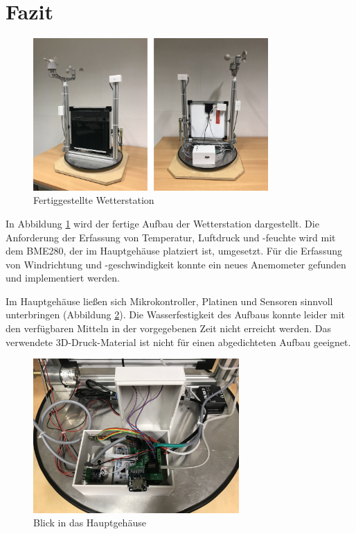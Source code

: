 \section{Fazit}\label{sec:fazit}
\begin{figure}[H]
  \centering
  \includegraphics[width=0.8\textwidth]{./img/Wetterstaion_fertig1.jpg}
  \caption{Fertiggestellte Wetterstation}\label{fig.Wetterstationfertig}
\end{figure}

In Abbildung \ref{fig.Wetterstationfertig} wird der fertige Aufbau der Wetterstation dargestellt. Die Anforderung der Erfassung von Temperatur, Luftdruck und -feuchte wird mit dem BME280, der im Hauptgehäuse platziert ist, umgesetzt. Für die Erfassung von Windrichtung und -geschwindigkeit konnte ein neues Anemometer gefunden und implementiert werden.

Im Hauptgehäuse ließen sich Mikrokontroller, Platinen und Sensoren sinnvoll unterbringen (Abbildung \ref{fig.hauptgehauese}). Die Wasserfestigkeit des Aufbaus konnte leider mit den verfügbaren Mitteln in der vorgegebenen Zeit nicht erreicht werden. Das verwendete 3D-Druck-Material ist nicht für einen abgedichteten Aufbau geeignet. 


\begin{figure}[H]
  \centering
  \includegraphics[width=0.7\textwidth]{./img/Hauptgehauese.jpg}
  \caption{Blick in das Hauptgehäuse}\label{fig.hauptgehauese}
\end{figure}

